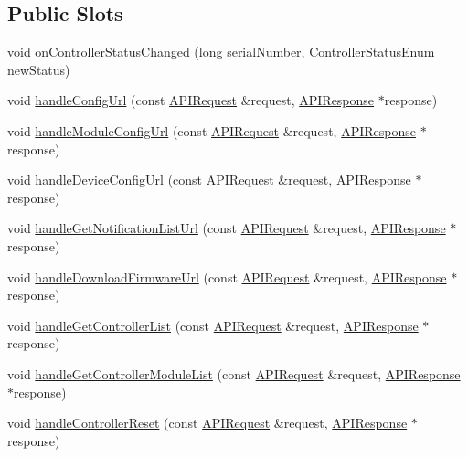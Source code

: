 \subsection*{Public Slots}
\begin{DoxyCompactItemize}
\item 
void \hyperlink{class_a_p_i_controller_a37992872aeb294f51ca323cc25075f69}{on\+Controller\+Status\+Changed} (long serial\+Number, \hyperlink{_global_defs_8h_a51207b6a49e0da6f9978a3019d93480a}{Controller\+Status\+Enum} new\+Status)
\item 
void \hyperlink{class_a_p_i_controller_ac1fe4dd7b8df2e4cceb554e46bea894d}{handle\+Config\+Url} (const \hyperlink{class_a_p_i_request}{A\+P\+I\+Request} \&request, \hyperlink{class_a_p_i_response}{A\+P\+I\+Response} $\ast$response)
\item 
void \hyperlink{class_a_p_i_controller_a6274380cb71807d07d813b7e67e0c0c2}{handle\+Module\+Config\+Url} (const \hyperlink{class_a_p_i_request}{A\+P\+I\+Request} \&request, \hyperlink{class_a_p_i_response}{A\+P\+I\+Response} $\ast$response)
\item 
void \hyperlink{class_a_p_i_controller_a3d32a4cf1f6a06697b09d43a2be140cf}{handle\+Device\+Config\+Url} (const \hyperlink{class_a_p_i_request}{A\+P\+I\+Request} \&request, \hyperlink{class_a_p_i_response}{A\+P\+I\+Response} $\ast$response)
\item 
void \hyperlink{class_a_p_i_controller_a3217b84dcc811d83e4c7241a5e19c35c}{handle\+Get\+Notification\+List\+Url} (const \hyperlink{class_a_p_i_request}{A\+P\+I\+Request} \&request, \hyperlink{class_a_p_i_response}{A\+P\+I\+Response} $\ast$response)
\item 
void \hyperlink{class_a_p_i_controller_afb480d438e18a2551229810280a65806}{handle\+Download\+Firmware\+Url} (const \hyperlink{class_a_p_i_request}{A\+P\+I\+Request} \&request, \hyperlink{class_a_p_i_response}{A\+P\+I\+Response} $\ast$response)
\item 
void \hyperlink{class_a_p_i_controller_ad37a3ecaf99e3b7c43ecb4ec4873fea9}{handle\+Get\+Controller\+List} (const \hyperlink{class_a_p_i_request}{A\+P\+I\+Request} \&request, \hyperlink{class_a_p_i_response}{A\+P\+I\+Response} $\ast$response)
\item 
void \hyperlink{class_a_p_i_controller_a20ce823aeb786d2af26fde41c2dc74a1}{handle\+Get\+Controller\+Module\+List} (const \hyperlink{class_a_p_i_request}{A\+P\+I\+Request} \&request, \hyperlink{class_a_p_i_response}{A\+P\+I\+Response} $\ast$response)
\item 
void \hyperlink{class_a_p_i_controller_a0e01eab749423dcfff0b595abf4175ad}{handle\+Controller\+Reset} (const \hyperlink{class_a_p_i_request}{A\+P\+I\+Request} \&request, \hyperlink{class_a_p_i_response}{A\+P\+I\+Response} $\ast$response)

\end{DoxyCompactItemize}
